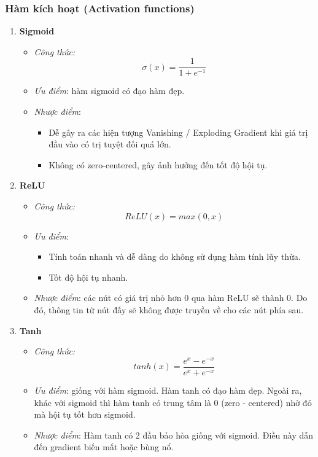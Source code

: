 \subsubsection{Hàm kích hoạt (Activation functions)}
\begin{enumerate}
	\item \textbf{Sigmoid}
	\begin{itemize}
		\item \textit{Công thức:}
		$$\sigma(x) = \frac{1}{1 + e^{-1}}$$
		\item \textit{Ưu điểm}: hàm sigmoid có đạo hàm đẹp.
		\item \textit{Nhược điểm}: 
		\begin{itemize}
			\item Dễ gây ra các hiện tượng Vanishing / Exploding Gradient khi giá trị đầu vào có trị tuyệt đối quá lớn.
			\item Không có zero-centered, gây ảnh hưởng đến tốt độ hội tụ.
		\end{itemize}
	\end{itemize}
	\item \textbf{ReLU}
	\begin{itemize}
		\item \textit{Công thức:}
		$$ReLU(x) = max(0, x)$$
		\item \textit{Ưu điểm}: 
		\begin{itemize}
			\item Tính toán nhanh và dễ dàng do không sử dụng hàm tính lũy thừa.
			\item Tốt độ hội tụ nhanh.
		\end{itemize}
		\item \textit{Nhược điểm}: các nút có giá trị nhỏ hơn 0 qua hàm ReLU sẽ thành 0. Do đó, thông tin từ nút đấy sẽ không được truyền về cho các nút phía sau.
	\end{itemize}
	\pagebreak

	\item \textbf{Tanh}
	\begin{itemize}
		\item \textit{Công thức:}
		$$tanh(x) = \frac{e^x - e^{-x}}{e^x + e^{-x}}$$
		\item \textit{Ưu điểm}: giống với hàm sigmoid. Hàm tanh có đạo hàm đẹp. Ngoài ra, khác với sigmoid thì hàm tanh có trung tâm là 0 (zero - centered) nhờ đó mà hội tụ tốt hơn sigmoid.
		\item \textit{Nhược điểm}: Hàm tanh có 2 đầu bảo hòa giống với sigmoid. Điều này dẫn đến gradient biến mất hoặc bùng nổ.
	\end{itemize}
\end{enumerate}

